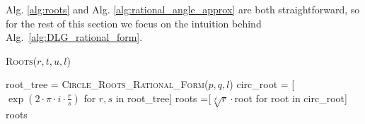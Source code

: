 \documentclass[runningheads]{llncs}
\begin{document}
Alg. \ref{alg:roots} and Alg. \ref{alg:rational_angle_approx} are both straightforward, so for the rest of this section we focus on the intuition behind Alg.~\ref{alg:DLG_rational_form}.

\begin{algorithm}
\caption{\textsc{Roots}($r,t,u,l$)}
\label{alg:roots}
\begin{algorithmic}
\STATE root\_tree = \textsc{Circle\_Roots\_Rational\_Form}($p,q,l$)
\STATE circ\_root = [$\exp\left(2\cdot\pi\cdot i \cdot \frac{r}{s}\right)$ for $r,s$ in root\_tree]
\STATE roots =[$\sqrt[2^l]{r}\cdot$root for root in circ\_root]
\RETURN roots
\end{algorithmic}
\end{algorithm}




%
%




\end{document}

